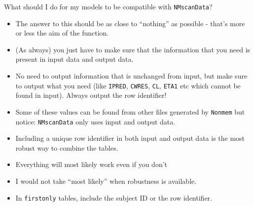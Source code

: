 \documentclass[
  8pt,
  ignorenonframetext,
  aspectratio=169]{beamer}
\begin{document}
\begin{frame}[fragile]{What should I do for my models to be compatible
with \texttt{NMscanData}?}
\protect\hypertarget{what-should-i-do-for-my-models-to-be-compatible-with-nmscandata}{}
\begin{itemize}
\item
  The answer to this should be as close to ``nothing'' as possible -
  that's more or less the aim of the function.
\item
  (As always) you just have to make sure that the information that you
  need is present in input data and output data.
\item
  No need to output information that is unchanged from input, but make
  sure to output what you need (like \texttt{IPRED}, \texttt{CWRES},
  \texttt{CL}, \texttt{ETA1} etc which cannot be found in input). Always
  output the row identifier!
\item
  Some of these values can be found from other files generated by
  \texttt{Nonmem} but notice: \texttt{NMscanData} only uses input and
  output data.
\item
  Including a unique row identifier in both input and output data is the
  most robust way to combine the tables.
\item
  Everything will most likely work even if you don't
\item
  I would not take ``most likely'' when robustness is available.
\item
  In \texttt{firstonly} tables, include the subject ID or the row
  identifier.
\end{itemize}
\end{frame}
\end{document}
